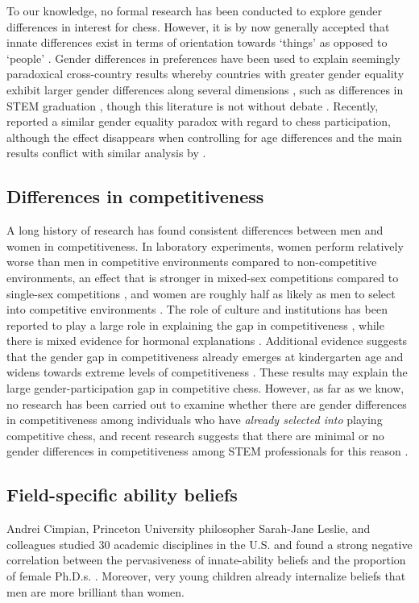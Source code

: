 \documentclass[9pt,twocolumn,twoside,lineno]{pnas-new}
\begin{document}
To our knowledge, no formal research has been conducted to explore gender differences in interest for chess. However, it is by now generally accepted that innate differences exist in terms of orientation towards `things' as opposed to `people' \cite{beltz2011,lippa2010}. Gender differences in preferences have been used to explain seemingly paradoxical cross-country results whereby countries with greater gender equality exhibit larger gender differences along several dimensions \cite{Falk2018,schmitt2017}, such as differences in STEM graduation \cite{Stoet2018}, though this literature is not without debate \cite{Richardson2020}. Recently, \citep{vishkin2022} reported a similar gender equality paradox with regard to chess participation, although the effect disappears when controlling for age differences and the main results conflict with similar analysis by \citep{dilmaghani2021}.

\subsection*{Differences in competitiveness}
A long history of research has found consistent differences between men and women in competitiveness. In laboratory experiments, women perform relatively worse than men in competitive environments compared to non-competitive environments, an effect that is stronger in mixed-sex competitions compared to single-sex competitions \cite{gneezy2003}, and women are roughly half as likely as men to select into competitive environments \cite{niederle2007}. The role of culture and institutions has been reported to play a large role in explaining the gap in competitiveness \cite{booth2018,zhang2018,andersen2013}, while there is mixed evidence for hormonal explanations \cite{apicella2011,wozniak2014,sapienza2009gender}. Additional evidence suggests that the gender gap in competitiveness already emerges at kindergarten age \cite{sutter2015} and widens towards extreme levels of competitiveness \cite{saccardo2018}. These results may explain the large gender-participation gap in competitive chess. However, as far as we know, no research has been carried out to examine whether there are gender differences in competitiveness among individuals who have \textit{already selected into} playing competitive chess, and recent research suggests that there are minimal or no gender differences in competitiveness among STEM professionals for this reason \cite{Boudreau2022}.



\subsection*{Field-specific ability beliefs}
Andrei Cimpian, Princeton University philosopher Sarah-Jane Leslie, and colleagues studied 30 academic disciplines in the U.S. and found a strong negative correlation between the pervasiveness of innate-ability beliefs and the proportion of female Ph.D.s. \cite{leslie2015expectations}. Moreover, very young children already internalize beliefs that men are more brilliant than women.
\end{document}
